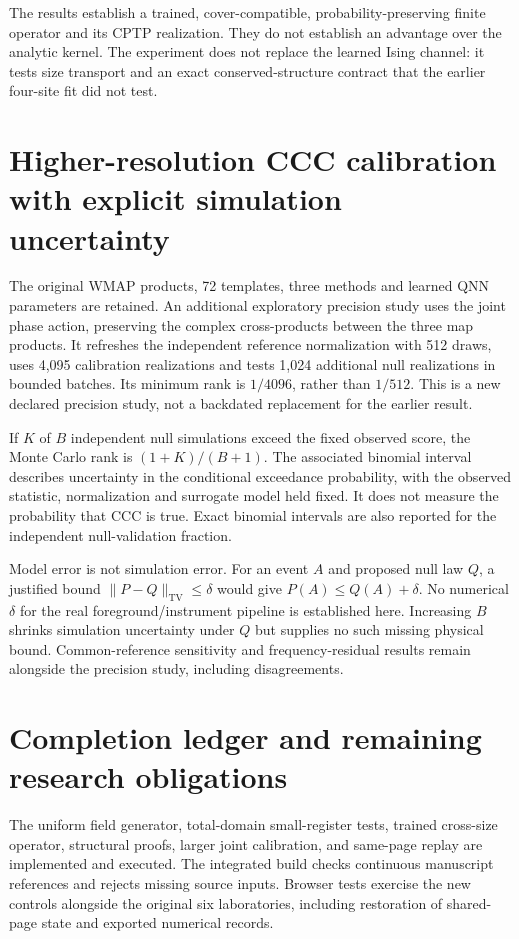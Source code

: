 \begin{center}\small\end{center}

The results establish a trained, cover-compatible, probability-preserving finite operator and its CPTP realization. They do not establish an advantage over the analytic kernel. The experiment does not replace the learned Ising channel: it tests size transport and an exact conserved-structure contract that the earlier four-site fit did not test.

\section{Higher-resolution CCC calibration with explicit simulation uncertainty}
The original WMAP products, 72 templates, three methods and learned QNN parameters are retained. An additional exploratory precision study uses the joint phase action, preserving the complex cross-products between the three map products. It refreshes the independent reference normalization with 512 draws, uses 4,095 calibration realizations and tests 1,024 additional null realizations in bounded batches. Its minimum rank is $1/4096$, rather than $1/512$. This is a new declared precision study, not a backdated replacement for the earlier result.

If $K$ of $B$ independent null simulations exceed the fixed observed score, the Monte Carlo rank is $(1+K)/(B+1)$. The associated binomial interval describes uncertainty in the conditional exceedance probability, with the observed statistic, normalization and surrogate model held fixed. It does not measure the probability that CCC is true. Exact binomial intervals are also reported for the independent null-validation fraction.

\begin{center}\small\end{center}

Model error is not simulation error. For an event $A$ and proposed null law $Q$, a justified bound $\|P-Q\|_{\mathrm{TV}}\le\delta$ would give $P(A)\le Q(A)+\delta$. No numerical $\delta$ for the real foreground/instrument pipeline is established here. Increasing $B$ shrinks simulation uncertainty under $Q$ but supplies no such missing physical bound. Common-reference sensitivity and frequency-residual results remain alongside the precision study, including disagreements.

\section{Completion ledger and remaining research obligations}
The uniform field generator, total-domain small-register tests, trained cross-size operator, structural proofs, larger joint calibration, and same-page replay are implemented and executed. The integrated build checks continuous manuscript references and rejects missing source inputs. Browser tests exercise the new controls alongside the original six laboratories, including restoration of shared-page state and exported numerical records.

